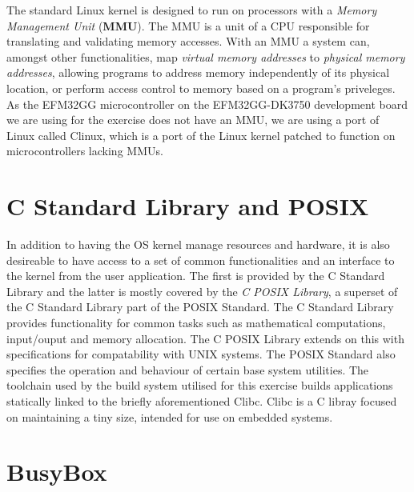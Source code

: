 The standard Linux kernel is designed to run on processors with a \emph{Memory
Management Unit} (\textbf{MMU}). The MMU is a unit of a CPU responsible for
translating and validating memory accesses. With an MMU a system can, amongst
other functionalities, map \emph{virtual memory addresses} to \emph{physical
memory addresses}, allowing programs to address memory independently of its
physical location, or perform access control to memory based on a program's
priveleges. As the EFM32GG microcontroller on the EFM32GG-DK3750 development
board we are using for the exercise does not have an MMU, we are using a port of
Linux called \textmu Clinux, which is a port of the Linux kernel patched to
function on microcontrollers lacking MMUs.

\section{C Standard Library and POSIX}

In addition to having the OS kernel manage resources and hardware, it is also
desireable to have access to a set of common functionalities and an interface to
the kernel from the user application. The first is provided by the C Standard
Library and the latter is mostly covered by the \emph{C POSIX Library}, a
superset of the C Standard Library part of the POSIX Standard. The C Standard
Library provides functionality for common tasks such as mathematical
computations, input/ouput and memory allocation. The C POSIX Library extends on
this with specifications for compatability with UNIX systems. The POSIX Standard
also specifies the operation and behaviour of certain base system utilities. The
toolchain used by the build system utilised for this exercise builds
applications statically linked to the briefly aforementioned \textmu Clibc.
\textmu Clibc is a C libray focused on maintaining a tiny size, intended for use
on embedded systems.

\section{BusyBox}


